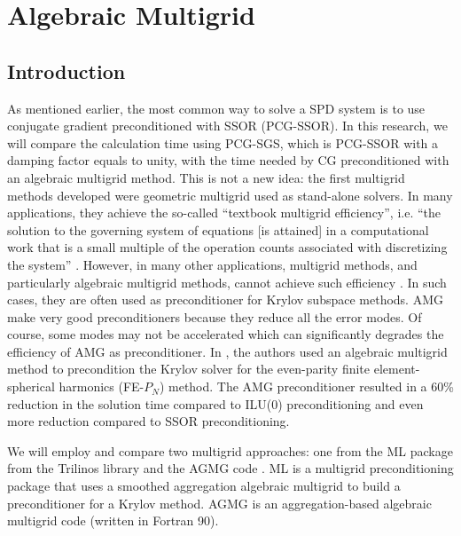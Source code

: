 \section{Algebraic Multigrid} \label{sec_amg}
\subsection{Introduction}
As mentioned earlier, the most common way to solve a SPD system is to use
conjugate gradient preconditioned with SSOR (PCG-SSOR). In this research, we
will compare the calculation time using PCG-SGS, which is PCG-SSOR with a
damping factor equals to unity, with the time needed by CG 
preconditioned with an algebraic multigrid method. This is not a new idea: the 
first multigrid methods developed were geometric multigrid used as stand-alone 
solvers. In many applications, they achieve the so-called ``textbook multigrid
efficiency'', i.e. ``the solution to the governing system of equations [is
attained] in a computational work that is a small multiple of the operation
counts associated with discretizing the system'' \cite{textbook_eff}. However, 
in many other applications, multigrid methods, and particularly algebraic 
multigrid methods, cannot achieve such efficiency \cite{k_cycle}. In
such cases, they are often used as preconditioner for Krylov subspace methods. 
AMG make  very good preconditioners because they reduce all the error modes. Of
course, some modes may not be accelerated which can significantly degrades the 
efficiency of AMG as preconditioner. In \cite{amg_pn}, the authors used an 
algebraic multigrid method to precondition the Krylov solver for the even-parity 
finite element-spherical harmonics (FE-$P_N$) method. The AMG preconditioner 
resulted in a 60\% reduction in the solution time compared to ILU(0) 
preconditioning and even more reduction compared to SSOR preconditioning. 

We will employ and compare two multigrid approaches: one from the ML package
\cite{ml_guide} from the Trilinos library and the AGMG code \cite{agmg_guide}. 
ML is a multigrid preconditioning package that uses a smoothed aggregation 
algebraic multigrid to build a preconditioner for a Krylov method. AGMG is an 
aggregation-based algebraic multigrid code (written in Fortran 90).

